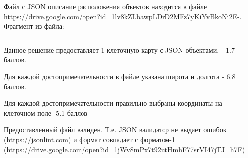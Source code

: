 \solutionSection

Файл с JSON описание расположения объектов находится в файле \url{https://drive.google.com/open?id=1lv8kZLbawpLDrD2MFz7yKiYvBkoNi2E-}. 
Фрагмент из файла: 

\inputminted[fontsize=\footnotesize, linenos]{json}{final/command_tour/ar/task_01/source.json}

\markSection

Данное решение предоставляет 1 клеточную карту с JSON объектами. - 1.7 баллов.

Для каждой достопримечательности в файле указана широта и долгота - 6.8 баллов.

Для каждой достопримечательности правильно выбраны координаты на клеточном поле- 5.1 баллов

Предоставленный файл валиден. Т.е. JSON валидатор не выдает ошибок (\url{https://jsonlint.com}) и формат совпадает с форматом-1 (\url{https://drive.google.com/open?id=1jWv8mPx7t92utHmhF77srVI47jTJ_h7F})